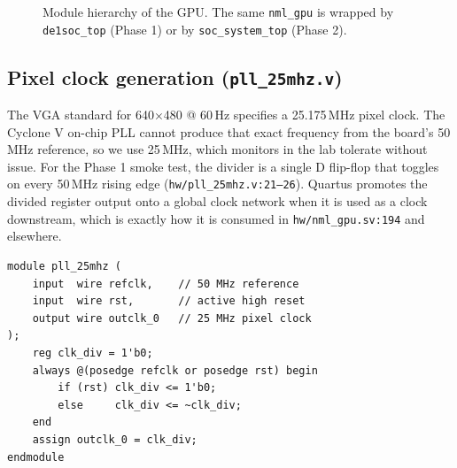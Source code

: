 \documentclass[11pt,letterpaper]{article}
\begin{document}
\begin{figure}[h]
\centering
{}
\caption{Module hierarchy of the GPU. The same \texttt{nml\_gpu} is wrapped by \texttt{de1soc\_top} (Phase 1) or by \texttt{soc\_system\_top} (Phase 2).}
\label{fig:hier}
\end{figure}

\subsection{Pixel clock generation (\texttt{pll\_25mhz.v})}

The VGA standard for 640$\times$480 @ 60\,Hz specifies a 25.175\,MHz pixel
clock. The Cyclone V on-chip PLL cannot produce that exact frequency from the
board's 50\,MHz reference, so we use 25\,MHz, which monitors in the lab
tolerate without issue. For the Phase 1 smoke test, the divider is a single
D flip-flop that toggles on every 50\,MHz rising edge
(\texttt{hw/pll\_25mhz.v:21--26}). Quartus promotes the divided register
output onto a global clock network when it is used as a clock downstream,
which is exactly how it is consumed in \texttt{hw/nml\_gpu.sv:194} and
elsewhere.

\begin{lstlisting}[style=sv, caption={Divide-by-2 implementation. Replace with \texttt{altera\_pll} IP in Phase 2.}]
module pll_25mhz (
    input  wire refclk,    // 50 MHz reference
    input  wire rst,       // active high reset
    output wire outclk_0   // 25 MHz pixel clock
);
    reg clk_div = 1'b0;
    always @(posedge refclk or posedge rst) begin
        if (rst) clk_div <= 1'b0;
        else     clk_div <= ~clk_div;
    end
    assign outclk_0 = clk_div;
endmodule
\end{lstlisting}
\end{document}
